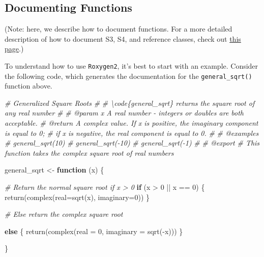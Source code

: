 \documentclass[
]{book}
\newenvironment{Shaded}{\begin{snugshade}}{\end{snugshade}}
\newcommand{\AttributeTok}[1]{\textcolor[rgb]{0.77,0.63,0.00}{#1}}
\newcommand{\CommentTok}[1]{\textcolor[rgb]{0.56,0.35,0.01}{\textit{#1}}}
\newcommand{\ControlFlowTok}[1]{\textcolor[rgb]{0.13,0.29,0.53}{\textbf{#1}}}
\newcommand{\DecValTok}[1]{\textcolor[rgb]{0.00,0.00,0.81}{#1}}
\newcommand{\FunctionTok}[1]{\textcolor[rgb]{0.00,0.00,0.00}{#1}}
\newcommand{\NormalTok}[1]{#1}
\newcommand{\OtherTok}[1]{\textcolor[rgb]{0.56,0.35,0.01}{#1}}
\newcommand{\SpecialCharTok}[1]{\textcolor[rgb]{0.00,0.00,0.00}{#1}}
\begin{document}
\hypertarget{documenting-functions}{%
\subsection{Documenting Functions}\label{documenting-functions}}

(Note: here, we describe how to document functions. For a more detailed description of how to document S3, S4, and reference classes, check out \href{http://r-pkgs.had.co.nz/man.html}{this page}.)

To understand how to use \texttt{Roxygen2}, it's best to start with an example. Consider the following code, which generates the documentation for the \texttt{general\_sqrt()} function above.

\begin{Shaded}
\begin{Highlighting}[]
\CommentTok{\#\textquotesingle{} Generalized Square Roots}
\CommentTok{\#\textquotesingle{}}
\CommentTok{\#\textquotesingle{} \textbackslash{}code\{general\_sqrt\} returns the square root of any real number}
\CommentTok{\#\textquotesingle{}}
\CommentTok{\#\textquotesingle{} @param x A real number {-} integers or doubles are both acceptable.}
\CommentTok{\#\textquotesingle{} @return A complex value. If x is positive, the imaginary component is equal to 0;}
\CommentTok{\#\textquotesingle{} if x is negative, the real component is equal to 0.}
\CommentTok{\#\textquotesingle{}}
\CommentTok{\#\textquotesingle{} @examples}
\CommentTok{\#\textquotesingle{} general\_sqrt(10)}
\CommentTok{\#\textquotesingle{} general\_sqrt({-}10)}
\CommentTok{\#\textquotesingle{} general\_sqrt({-}1)}
\CommentTok{\#\textquotesingle{}}
\CommentTok{\#\textquotesingle{} @export}
\CommentTok{\# This function takes the complex square root of real numbers}

\NormalTok{general\_sqrt }\OtherTok{\textless{}{-}} \ControlFlowTok{function}\NormalTok{ (x) \{}

  \CommentTok{\# Return the normal square root if x \textgreater{} 0}
  \ControlFlowTok{if}\NormalTok{ (x }\SpecialCharTok{\textgreater{}} \DecValTok{0} \SpecialCharTok{||}\NormalTok{ x }\SpecialCharTok{==} \DecValTok{0}\NormalTok{) \{}
    \FunctionTok{return}\NormalTok{(}\FunctionTok{complex}\NormalTok{(}\AttributeTok{real=}\FunctionTok{sqrt}\NormalTok{(x), }\AttributeTok{imaginary=}\DecValTok{0}\NormalTok{))}
\NormalTok{  \}}

  \CommentTok{\# Else return the complex square root}

  \ControlFlowTok{else}\NormalTok{ \{}
    \FunctionTok{return}\NormalTok{(}\FunctionTok{complex}\NormalTok{(}\AttributeTok{real =} \DecValTok{0}\NormalTok{, }\AttributeTok{imaginary =} \FunctionTok{sqrt}\NormalTok{(}\SpecialCharTok{{-}}\NormalTok{x)))}
\NormalTok{  \}}

\NormalTok{\}}
\end{Highlighting}
\end{Shaded}
\end{document}
